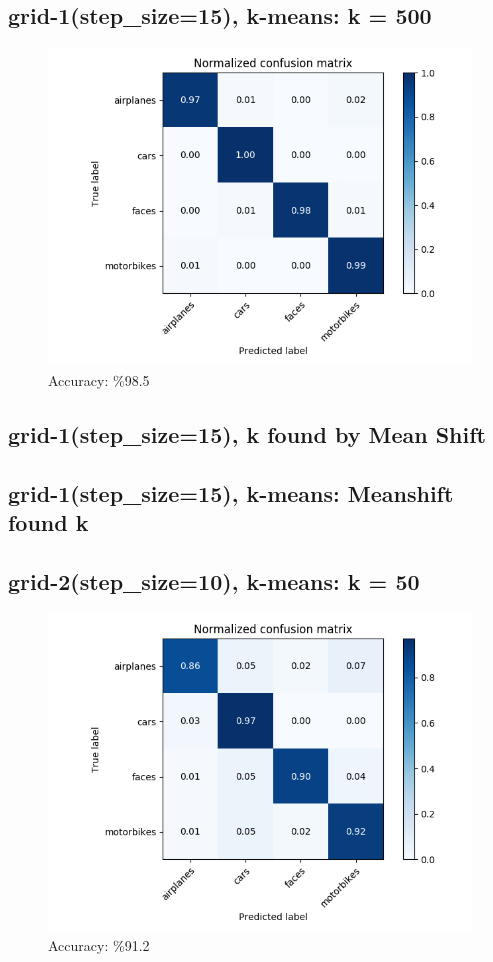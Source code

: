 \subsection*{grid-1(step\_size=15), k-means: k = 500}
\begin{figure}[H]
    \centering
    \includegraphics[width=\textwidth]{images/confusion-stp-15-500.png}
    \caption*{Accuracy: \%98.5}
\end{figure}

\subsection*{grid-1(step\_size=15), k found by Mean Shift}
\subsection*{grid-1(step\_size=15), k-means: Meanshift found k}

\subsection*{grid-2(step\_size=10), k-means: k = 50}
\begin{figure}[H]
    \centering
    \includegraphics[width=\textwidth]{images/confusion-stp-10-50.png}
    \caption*{Accuracy: \%91.2}
\end{figure}


